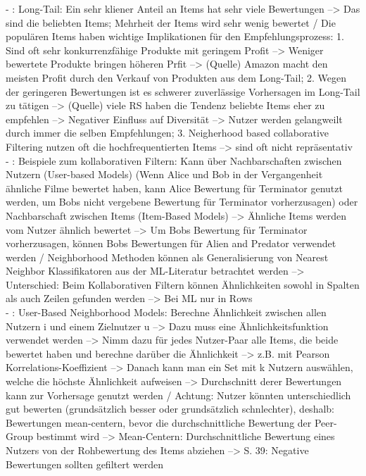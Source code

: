 - \cite[S. 32]{recommenderSystems:2016}: Long-Tail: Ein sehr kliener Anteil an Items hat sehr viele Bewertungen --> Das sind die beliebten Items; Mehrheit der Items wird sehr wenig bewertet / Die populären Items haben wichtige Implikationen für den Empfehlungsprozess: 1. Sind oft sehr konkurrenzfähige Produkte mit geringem Profit --> Weniger bewertete Produkte bringen höheren Prfit --> (Quelle) Amazon macht den meisten Profit durch den Verkauf von Produkten aus dem Long-Tail; 2. Wegen der geringeren Bewertungen ist es schwerer zuverlässige Vorhersagen im Long-Tail zu tätigen --> (Quelle) viele RS haben die Tendenz beliebte Items eher zu empfehlen --> Negativer Einfluss auf Diversität --> Nutzer werden gelangweilt durch immer die selben Empfehlungen; 3. Neigherhood based collaborative Filtering nutzen oft die hochfrequentierten Items --> sind oft nicht repräsentativ\\
- \cite[S. 33]{recommenderSystems:2016}: Beispiele zum kollaborativen Filtern: Kann über Nachbarschaften zwischen Nutzern (User-based Models) (Wenn Alice und Bob in der Vergangenheit ähnliche Filme bewertet haben, kann Alice Bewertung für Terminator genutzt werden, um Bobs nicht vergebene Bewertung für Terminator vorherzusagen) oder Nachbarschaft zwischen Items (Item-Based Models) --> Ähnliche Items werden vom Nutzer ähnlich bewertet --> Um Bobs Bewertung für Terminator vorherzusagen, können Bobs Bewertungen für Alien and Predator verwendet werden / Neighborhood Methoden können als Generalisierung von Nearest Neighbor Klassifikatoren aus der ML-Literatur betrachtet werden --> Unterschied: Beim Kollaborativen Filtern können Ähnlichkeiten sowohl in Spalten als auch Zeilen gefunden werden --> Bei ML nur in Rows\\
- \cite[S. 34f.]{recommenderSystems:2016}: User-Based Neighborhood Models: Berechne Ähnlichkeit zwischen allen Nutzern i und einem Zielnutzer u --> Dazu muss eine Ähnlichkeitsfunktion verwendet werden --> Nimm dazu für jedes Nutzer-Paar alle Items, die beide bewertet haben und berechne darüber die Ähnlichkeit --> z.B. mit Pearson Korrelations-Koeffizient --> Danach kann man ein Set mit k Nutzern auswählen, welche die höchste Ähnlichkeit aufweisen --> Durchschnitt derer Bewertungen kann zur Vorhersage genutzt werden / Achtung: Nutzer könnten unterschiedlich gut bewerten (grundsätzlich besser oder grundsätzlich schnlechter), deshalb: Bewertungen mean-centern, bevor die durchschnittliche Bewertung der Peer-Group bestimmt wird --> Mean-Centern: Durchschnittliche Bewertung eines Nutzers von der Rohbewertung des Items abziehen --> S. 39: Negative Bewertungen sollten gefiltert werden\\
